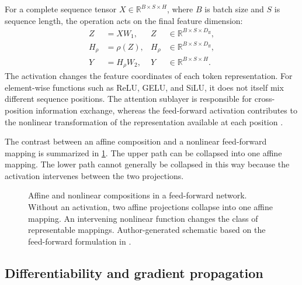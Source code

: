 For a complete sequence tensor
\(X\in\mathbb{R}^{B\times S\times H}\), where \(B\) is batch size and
\(S\) is sequence length, the operation acts on the final feature
dimension:
\begin{align}
    Z &= XW_1,
    & Z&\in\mathbb{R}^{B\times S\times D_{\mathrm{ff}}},
    \label{eq:act-batch-projection}\\
    H_{\rho} &= \rho(Z),
    & H_{\rho}&\in\mathbb{R}^{B\times S\times D_{\mathrm{ff}}},
    \label{eq:act-batch-activation}\\
    Y &= H_{\rho}W_2,
    & Y&\in\mathbb{R}^{B\times S\times H}.
    \label{eq:act-batch-output}
\end{align}
The activation changes the feature coordinates of each token representation.
For element-wise functions such as ReLU, GELU, and SiLU, it does not itself
mix different sequence positions. The attention sublayer is responsible for
cross-position information exchange, whereas the feed-forward activation
contributes to the nonlinear transformation of the representation available
at each position \parencite{han2024review,zhuo2025polycom}.

The contrast between an affine composition and a nonlinear feed-forward
mapping is summarized in \cref{fig:act-nonlinearity}. The upper path can be
collapsed into one affine mapping. The lower path cannot generally be
collapsed in this way because the activation intervenes between the two
projections.

\begin{figure}[htbp]
    \centering
    
    \caption{Affine and nonlinear compositions in a feed-forward network.
    Without an activation, two affine projections collapse into one affine
    mapping. An intervening nonlinear function changes the class of
    representable mappings. Author-generated schematic based on the
    feed-forward formulation in \textcite{zhuo2025polycom}.}
    \label{fig:act-nonlinearity}
\end{figure}

\subsection{Differentiability and gradient propagation}
\label{subsec:act-gradients}

